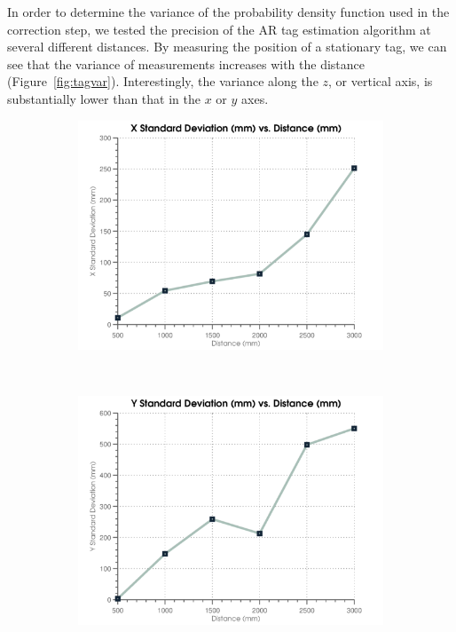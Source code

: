 			In order to determine the variance of the probability density function used in the correction step, we tested the precision of the AR tag estimation algorithm at several different distances. By measuring the position of a stationary tag, we can see that the variance of measurements increases with the distance (Figure~\ref{fig:tagvar}). Interestingly, the variance along the $z$, or vertical axis, is substantially lower than that in the $x$ or $y$ axes.

			\begin{figure}[ht]
			        \centering
			        \begin{subfigure}[b]{0.32\textwidth}
			                \centering
			                \includegraphics[width=\textwidth]{../images/artest_x.png}
			                \label{fig:tagvarx}
			        \end{subfigure}%
			        ~
			        \begin{subfigure}[b]{0.32\textwidth}
			                \centering
			                \includegraphics[width=\textwidth]{../images/artest_y.png}

\end{subfigure}
\end{figure}
